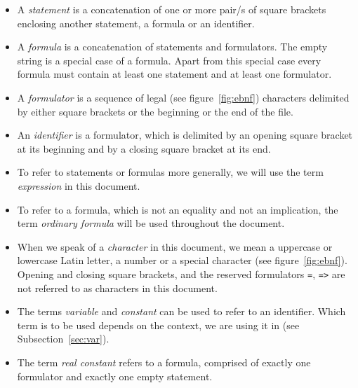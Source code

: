 \documentclass[british]{article}
\newcommand\prv{bc}
\newcommand\m[1]{\texttt{#1}}
\begin{document}
\begin{itemize}
	\item
		A \emph{statement} is a concatenation of one or more pair/s of square
		brackets enclosing another statement, a formula or an identifier.
	\item
		A \emph{formula} is a concatenation of statements and formulators.
		The empty string is a special case of a formula. Apart from this special
		case every formula must contain at least one statement and at least
		one formulator.
	\item
		A \emph{formulator} is a sequence of legal (see figure~\ref{fig:ebnf})
		characters delimited by either square brackets or the beginning or the
		end of the file.
	\item
		An \emph{identifier} is a formulator, which is delimited by an opening
		square bracket at its beginning and by a closing square bracket at its
		end.
	\item
		To refer to statements or formulas more generally, we will use the
		term \emph{expression }in this document.
	\item
		To refer to a formula, which is not an equality and not an implication,
		the term \emph{ordinary formula} will be used throughout the document.
	\item
		When we speak of a \emph{character} in this document, we mean a
		uppercase or lowercase Latin letter, a number or a special character
		(see figure~\ref{fig:ebnf}). Opening and closing square brackets, and
		the reserved formulators \m{=}, \m{=>} are not referred to as characters
		in this document.
	\item
		The terms \emph{variable} and \emph{constant} can be used to refer
		to an identifier. Which term is to be used depends on the context,
		we are using it in (see Subsection~\ref{sec:var}).
	\item
		The term \emph{real constant} refers to a formula, comprised of exactly
		one formulator and exactly one empty statement.
\end{itemize}
\end{document}
